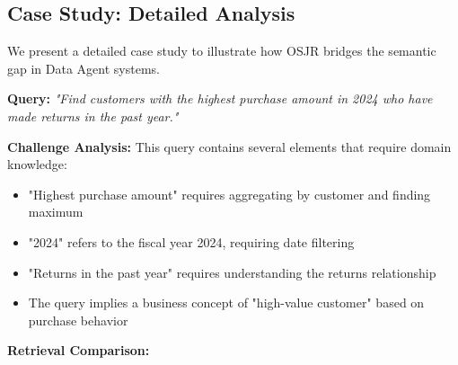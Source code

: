 \documentclass[sigconf, nonatbib]{acmart}
\begin{document}
\subsection{Case Study: Detailed Analysis}
\label{sec:case_study}

We present a detailed case study to illustrate how OSJR bridges the semantic gap in Data Agent systems.

\noindent\textbf{Query:} \textit{"Find customers with the highest purchase amount in 2024 who have made returns in the past year."}

\noindent\textbf{Challenge Analysis:} This query contains several elements that require domain knowledge:
\begin{itemize}
    \item "Highest purchase amount" requires aggregating by customer and finding maximum
    \item "2024" refers to the fiscal year 2024, requiring date filtering
    \item "Returns in the past year" requires understanding the returns relationship
    \item The query implies a business concept of "high-value customer" based on purchase behavior
\end{itemize}

\noindent\textbf{Retrieval Comparison:}

\begin{table}[t]
    \caption{Retrieval Results for Case Study Query}
    \label{tab:case_study}
    \centering
\end{table}
\end{document}
